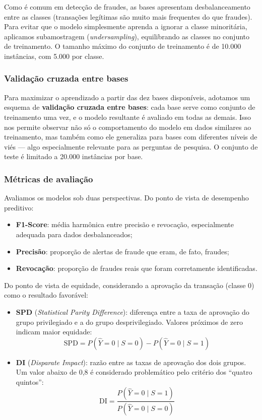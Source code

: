 Como é comum em detecção de fraudes, as bases apresentam desbalanceamento entre as classes (transações legítimas são muito mais frequentes do que fraudes). Para evitar que o modelo simplesmente aprenda a ignorar a classe minoritária, aplicamos subamostragem (\textit{undersampling}), equilibrando as classes no conjunto de treinamento. O tamanho máximo do conjunto de treinamento é de 10.000 instâncias, com 5.000 por classe.

\subsubsection{Validação cruzada entre bases}

Para maximizar o aprendizado a partir das dez bases disponíveis, adotamos um esquema de \textbf{validação cruzada entre bases}: cada base serve como conjunto de treinamento uma vez, e o modelo resultante é avaliado em todas as demais. Isso nos permite observar não só o comportamento do modelo em dados similares ao treinamento, mas também como ele generaliza para bases com diferentes níveis de viés --- algo especialmente relevante para as perguntas de pesquisa. O conjunto de teste é limitado a 20.000 instâncias por base.

\subsubsection{Métricas de avaliação}

Avaliamos os modelos sob duas perspectivas. Do ponto de vista de desempenho preditivo:

\begin{itemize}
    \item \textbf{F1-Score}: média harmônica entre precisão e revocação, especialmente adequada para dados desbalanceados;
    \item \textbf{Precisão}: proporção de alertas de fraude que eram, de fato, fraudes;
    \item \textbf{Revocação}: proporção de fraudes reais que foram corretamente identificadas.
\end{itemize}

Do ponto de vista de equidade, considerando a aprovação da transação (classe 0) como o resultado favorável:

\begin{itemize}
    \item \textbf{SPD} (\textit{Statistical Parity Difference}): diferença entre a taxa de aprovação do grupo privilegiado e a do grupo desprivilegiado. Valores próximos de zero indicam maior equidade:
    \[
    \text{SPD} = P(\hat{Y} = 0\mid S = 0) - P(\hat{Y} = 0\mid S = 1)
    \]

    \item \textbf{DI} (\textit{Disparate Impact}): razão entre as taxas de aprovação dos dois grupos. Um valor abaixo de 0,8 é considerado problemático pelo critério dos ``quatro quintos'':
    \[
    \text{DI} = \frac{P(\hat{Y} = 0\mid S = 1)}{P(\hat{Y} = 0\mid S = 0)}
    \]
\end{itemize}